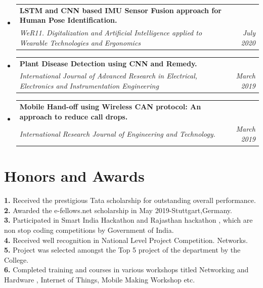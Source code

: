 \documentclass[A4,11pt]{article}
\makeatletter
\newcommand{\CVSubheading}[4]{
  \vspace{-2pt}\item
    \begin{tabular*}{0.97\textwidth}[t]{l@{\extracolsep{\fill}}r}
      \textbf{#1} & \small{#2} \\
      \textit{\small#3} & \textit{\small #4} \\
    \end{tabular*}\vspace{-7pt}
}
\newcommand{\CVSubHeadingListStart}{\vspace{1pt}\begin{itemize}[leftmargin=0.5cm, label={}]}
\newcommand{\CVSubHeadingListEnd}{\end{itemize}}
\makeatother
\begin{document}
  \CVSubHeadingListStart
          \CVSubheading
      {LSTM and CNN based IMU Sensor
Fusion approach for Human Pose
Identification.}{\href{http://www.icnr2020.org/wp-content/uploads/2020/10/ICNR-WeRob-PROGRAM_v3.pdf}{\faExternalLink}}
      {WeR11. Digitalization and Artificial Intelligence
applied to Wearable Technologies
and Ergonomics}{ July 2020}
      
      
    \CVSubheading
      {Plant Disease Detection
using CNN and Remedy.}{\href{http://www.ijareeie.com/upload/2019/march/14_Plant.pdf}{\faExternalLink}}
      {International
Journal of Advanced Research in Electrical,
Electronics and Instrumentation Engineering}{ March 2019}

    \CVSubheading
      {Mobile Hand-off
using Wireless CAN protocol: An approach
to reduce call drops.}{\href{https://www.irjet.net/archives/V6/i3/IRJET-V6I383.pdf}{\faExternalLink}}
      {International Research
Journal of Engineering and Technology.}{ March
2019}

  \CVSubHeadingListEnd

\section{\textbf{Honors and Awards}}
 \begin{itemize}[leftmargin=0.5cm, label={}]
    \small{\item{
     \textbf{1. }{Received the prestigious Tata scholarship for outstanding overall performance.} \\
         \textbf{2. }{Awarded the e-fellows.net scholarship in May 2019-Stuttgart,Germany.}\\
\textbf{3. }{Participated in Smart India Hackathon and Rajasthan hackathon , which are non stop coding competitions by Government of India.} \\
     \textbf{4. }{Received well recognition in National Level Project  Competition. Networks.} \\
     \textbf{5. }{Project was selected amongst the Top 5 project of the department by the College.} \\
          \textbf{6. }{Completed training and courses in various workshops titled Networking and Hardware , Internet of Things, Mobile Making Workshop etc.} \\
     

 

    }}
 \end{itemize}

\end{document}
